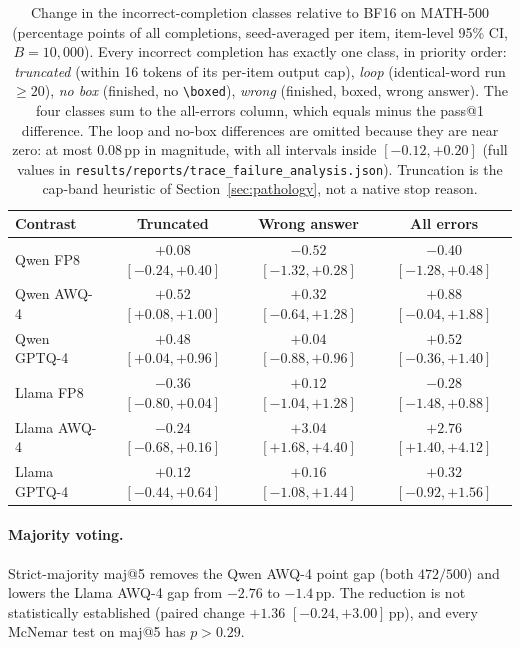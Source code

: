 \documentclass[11pt,a4paper]{article}
\begin{document}
\begin{table}[t]
\centering
\caption{Change in the incorrect-completion classes relative to BF16 on MATH-500 (percentage points of all completions, seed-averaged per item, item-level 95\% CI, $B=10{,}000$). Every incorrect completion has exactly one class, in priority order: \emph{truncated} (within 16 tokens of its per-item output cap), \emph{loop} (identical-word run $\ge 20$), \emph{no box} (finished, no \texttt{\textbackslash boxed}), \emph{wrong} (finished, boxed, wrong answer). The four classes sum to the all-errors column, which equals minus the pass@1 difference. The loop and no-box differences are omitted because they are near zero: at most 0.08\,pp in magnitude, with all intervals inside $[-0.12,+0.20]$ (full values in \texttt{results/reports/trace\_failure\_analysis.json}). Truncation is the cap-band heuristic of Section~\ref{sec:pathology}, not a native stop reason.}
\label{tab:failure}
\small
\begin{tabular}{lccc}
\toprule
\textbf{Contrast} & \textbf{Truncated} & \textbf{Wrong answer} & \textbf{All errors} \\
\midrule
Qwen FP8 & $+0.08$ $[-0.24,+0.40]$ & $-0.52$ $[-1.32,+0.28]$ & $-0.40$ $[-1.28,+0.48]$ \\
Qwen AWQ-4 & $+0.52$ $[+0.08,+1.00]$ & $+0.32$ $[-0.64,+1.28]$ & $+0.88$ $[-0.04,+1.88]$ \\
Qwen GPTQ-4 & $+0.48$ $[+0.04,+0.96]$ & $+0.04$ $[-0.88,+0.96]$ & $+0.52$ $[-0.36,+1.40]$ \\
\midrule
Llama FP8 & $-0.36$ $[-0.80,+0.04]$ & $+0.12$ $[-1.04,+1.28]$ & $-0.28$ $[-1.48,+0.88]$ \\
Llama AWQ-4 & $-0.24$ $[-0.68,+0.16]$ & $+3.04$ $[+1.68,+4.40]$ & $+2.76$ $[+1.40,+4.12]$ \\
Llama GPTQ-4 & $+0.12$ $[-0.44,+0.64]$ & $+0.16$ $[-1.08,+1.44]$ & $+0.32$ $[-0.92,+1.56]$ \\
\bottomrule
\end{tabular}
\end{table}

\paragraph{Majority voting.} Strict-majority maj@5 removes the Qwen AWQ-4 point gap (both $472/500$) and lowers the Llama AWQ-4 gap from $-2.76$ to $-1.4$\,pp. The reduction is not statistically established (paired change $+1.36$ $[-0.24,+3.00]$\,pp), and every McNemar test on maj@5 has $p>0.29$.
\end{document}
